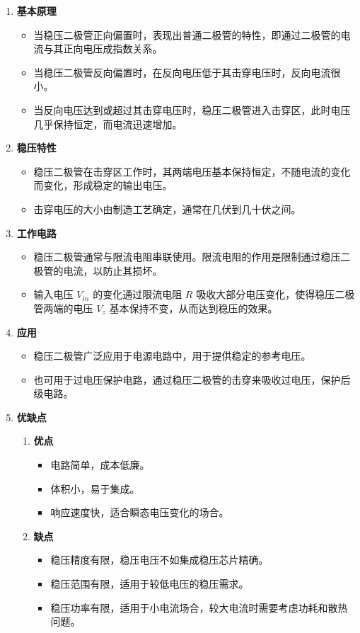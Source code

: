 \documentclass[dvipsnames, svgnames,a4paper,11pt]{article}
\begin{document}
		\begin{enumerate}
			\item \textbf{基本原理}
				\begin{itemize}
					\item 当稳压二极管正向偏置时，表现出普通二极管的特性，即通过二极管的电流与其正向电压成指数关系。
					\item 当稳压二极管反向偏置时，在反向电压低于其击穿电压时，反向电流很小。
					\item 当反向电压达到或超过其击穿电压时，稳压二极管进入击穿区，此时电压几乎保持恒定，而电流迅速增加。
				\end{itemize}
			
			\item \textbf{稳压特性}
				\begin{itemize}
					\item 稳压二极管在击穿区工作时，其两端电压基本保持恒定，不随电流的变化而变化，形成稳定的输出电压。
					\item 击穿电压的大小由制造工艺确定，通常在几伏到几十伏之间。
				\end{itemize}
			
			\item \textbf{工作电路}
				\begin{itemize}
					\item 稳压二极管通常与限流电阻串联使用。限流电阻的作用是限制通过稳压二极管的电流，以防止其损坏。
					\item 输入电压 \( V_{in} \) 的变化通过限流电阻 \( R \) 吸收大部分电压变化，使得稳压二极管两端的电压 \( V_z \) 基本保持不变，从而达到稳压的效果。
				\end{itemize}
			
			\item \textbf{应用}
				\begin{itemize}
					\item 稳压二极管广泛应用于电源电路中，用于提供稳定的参考电压。
					\item 也可用于过电压保护电路，通过稳压二极管的击穿来吸收过电压，保护后级电路。
				\end{itemize}
			
			\item \textbf{优缺点}
				\begin{enumerate}
					\item \textbf{优点}
						\begin{itemize}
							\item 电路简单，成本低廉。
							\item 体积小，易于集成。
							\item 响应速度快，适合瞬态电压变化的场合。
						\end{itemize}
					\item \textbf{缺点}
						\begin{itemize}
							\item 稳压精度有限，稳压电压不如集成稳压芯片精确。
							\item 稳压范围有限，适用于较低电压的稳压需求。
							\item 稳压功率有限，适用于小电流场合，较大电流时需要考虑功耗和散热问题。
						\end{itemize}
				\end{enumerate}
		\end{enumerate}
\end{document}
